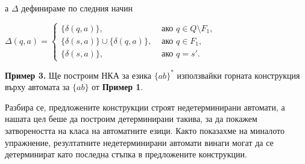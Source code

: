 \documentclass[openany]{book}
\begin{document}
         а $\Delta$ дефинираме по следния начин
    
         \begin{center}
            $\Delta(q,a) =
            \begin{cases}
              \{\delta(q,a)\}, & \text { ако } q \in Q \setminus F_1, \\
              \{\delta(s,a)\} \cup \{\delta(q,a)\}, & \text { ако } q \in F_1, \\
              \{\delta(s,a)\}, & \text { ако } q = s'.
            \end{cases}$
         \end{center}
    
    \vspace{15pt}
    
    \textbf{Пример 3.} Ще построим НКА за езика $\{ab\}^*$ използвайки 
    горната конструкция върху автомата за $\{ab\}$ от \textbf{Пример 1}.
    
    \vspace{15pt}
    
    \begin{center}
        \end{center}
    
    \vspace{15pt}
    
    Разбира се, предложените конструкции строят недетерминирани автомати, а нашата цел
    беше да построим детерминирани такива, за да покажем затвореността на класа на
    автоматните езици. Както показахме на миналото упражнение, резултатните недетерминирани
    автомати винаги могат да се детерминират като последна стъпка в предложените конструкции.
    
\end{document}
